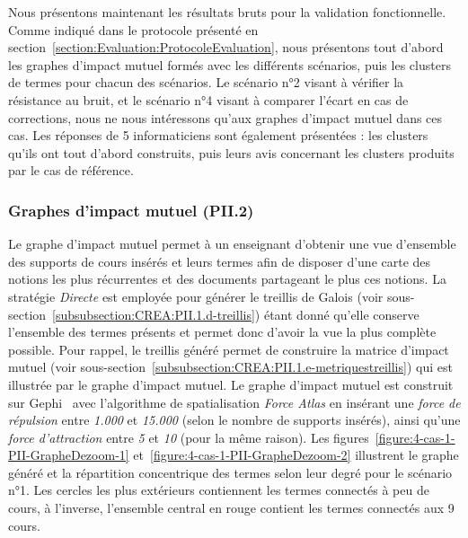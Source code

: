 Nous présentons maintenant les résultats bruts pour la validation fonctionnelle.
Comme indiqué dans le protocole présenté en section~\ref{section:Evaluation:ProtocoleEvaluation}, nous présentons tout d'abord les graphes d'impact mutuel formés avec les différents scénarios, puis les clusters de termes pour chacun des scénarios.
Le scénario n°2 visant à vérifier la résistance au bruit, et le scénario n°4 visant à comparer l'écart en cas de corrections, nous ne nous intéressons qu'aux graphes d'impact mutuel dans ces cas.
Les réponses de 5 informaticiens sont également présentées : les clusters qu'ils ont tout d'abord construits, puis leurs avis concernant les clusters produits par le cas de référence.



\subsubsection{Graphes d'impact mutuel (PII.2)}
\label{subsubsection:Evaluation:DeroulementExperimentations:ValidationFonctionnelle:GraphesImpactMutuel}

Le graphe d'impact mutuel permet à un enseignant d'obtenir une vue d'ensemble des supports de cours insérés et leurs termes afin de disposer d'une carte des notions les plus récurrentes et des documents partageant le plus ces notions.
La stratégie \textit{Directe} est employée pour générer le treillis de Galois (voir sous-section~\ref{subsubsection:CREA:PII.1.d-treillis}) étant donné qu'elle conserve l'ensemble des termes présents et permet donc d'avoir la vue la plus complète possible.
Pour rappel, le treillis généré permet de construire la matrice d'impact mutuel (voir sous-section~\ref{subsubsection:CREA:PII.1.e-metriquestreillis}) qui est illustrée par le graphe d'impact mutuel.
Le graphe d'impact mutuel est construit sur Gephi~\cite{bastian2009gephi} avec l'algorithme de spatialisation \textit{Force Atlas} en insérant une \textit{force de répulsion} entre \textit{1.000} et \textit{15.000} (selon le nombre de supports insérés), ainsi qu'une \textit{force d'attraction} entre \textit{5} et \textit{10} (pour la même raison).
Les figures~\ref{figure:4-cas-1-PII-GrapheDezoom-1} et~\ref{figure:4-cas-1-PII-GrapheDezoom-2} illustrent le graphe généré et la répartition concentrique des termes selon leur degré pour le scénario n°1.
Les cercles les plus extérieurs contiennent les termes connectés à peu de cours, à l'inverse, l'ensemble central en rouge contient les termes connectés aux 9 cours.

\bigskip

